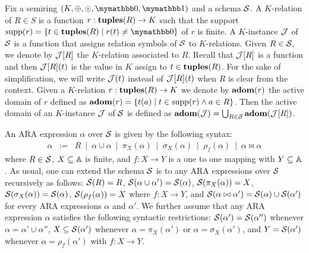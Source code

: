 Fix a semiring $(K, \ksum, \kprod, \kzero, \kone)$ and a schema $\mathcal{S}$. A $K$-relation of $R \in S$ is a function $r: \mathbf{tuples}(R) \rightarrow K$ such that the support  $\supp(r) = \{t \in \tuples(R) \mid r(t) \neq \kzero\}$ of $r$ is finite. 
A $K$-instance $\mathcal{J}$ of $\mathcal{S}$ is a function that assigns relation symbols of $\mathcal{S}$ to $K$-relations. Given $R \in \mathcal{S}$, we denote by $\mathcal{J}[R]$ the $K$-relation associated to $R$. Recall that $\mathcal{J}[R]$ is a function and then $\mathcal{J}[R](t)$ is the value in $K$ assign to $t \in \mathbf{tuples}(R)$. For the sake of simplification, we will write $\mathcal{J}(t)$ instead of $\mathcal{J}[R](t)$ when $R$ is clear from the context. 
Given a $K$-relation $r:\mathbf{tuples}(R) \rightarrow K$ we denote by $\mathbf{adom}(r)$ the active domain of $r$ defined as $\mathbf{adom}(r) = \{t(a) \mid t \in \operatorname{supp}(r) \wedge a \in R\}$.
Then the active domain of an $K$-instance $\mathcal{J}$ of $\mathcal{S}$ is defined as $\mathbf{adom}(\mathcal{J}) = \bigcup_{R \in \mathcal{S}} \mathbf{adom}(\mathcal{J}[R])$.

An ARA expression $\alpha$ over $\mathcal{S}$ is given by the following syntax:
$$
\begin{array}{rcl}
\alpha & := & R \ \mid \ \alpha \cup \alpha \ \mid \  \pi_X(\alpha) \ \mid \  \sigma_X(\alpha) \ \mid \ \rho_f(\alpha) \ \mid \ \alpha \bowtie \alpha
\end{array}
$$
where $R \in \mathcal{S}$, $X \subseteq \mathbb{A}$ is finite, and $f: X \rightarrow Y$ is a one to one mapping with $Y \subseteq \mathbb{A}$. As usual, one can extend the schema $\mathcal{S}$ is to any ARA expressions over $\mathcal{S}$ recursively as follows: $\mathcal{S}(R) = R$, $\mathcal{S}(\alpha \cup \alpha') = \mathcal{S}(\alpha)$, $\mathcal{S}(\pi_X(\alpha)) = X$, $\mathcal{S}(\sigma_X(\alpha)) = \mathcal{S}(\alpha)$, $\mathcal{S}(\rho_f(\alpha)) = X$ where $f:X \rightarrow Y$, and $\mathcal{S}(\alpha \bowtie \alpha') = \mathcal{S}(\alpha) \cup \mathcal{S}(\alpha')$ for every ARA expressions $\alpha$ and $\alpha'$.
We further assume that any ARA expression $\alpha$ satisfies the following syntactic restrictions: $\mathcal{S}(\alpha') = \mathcal{S}(\alpha'')$ whenever $\alpha = \alpha' \cup \alpha''$, $X \subseteq \mathcal{S}(\alpha')$ whenever $\alpha = \pi_X(\alpha')$ or $\alpha = \sigma_X(\alpha')$, and $Y = \mathcal{S}(\alpha')$ whenever $\alpha = \rho_f(\alpha')$ with $f: X \rightarrow Y$.


